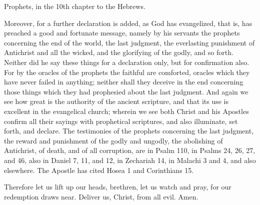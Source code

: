 Prophets, in the 10th chapter to the Hebrews.

Moreover, for a further declaration is added, as God has evangelized, that is, has preached a good and fortunate message, namely by his servants the prophets concerning the end of the world, the last judgment, the everlasting punishment of Antichrist and all the wicked, and the glorifying of the godly, and so forth. Neither did he say these things for a declaration only, but for confirmation also. For by the oracles of the prophets the faithful are comforted, oracles which they have never failed in anything; neither shall they deceive in the end concerning those things which they had prophesied about the last judgment. And again we see how great is the authority of the ancient scripture, and that its use is excellent in the evangelical church; wherein we see both Christ and his Apostles confirm all their sayings with prophetical scriptures, and also illuminate, set forth, and declare. The testimonies of the prophets concerning the last judgment, the reward and punishment of the godly and ungodly, the abolishing of Antichrist, of death, and of all corruption, are in Psalm 110, in Psalms 24, 26, 27, and 46, also in Daniel 7, 11, and 12, in Zechariah 14, in Malachi 3 and 4, and also elsewhere. The Apostle has cited Hosea 1 and Corinthians 15.

Therefore let us lift up our heads, brethren, let us watch and pray, for our redemption draws near. Deliver us, Christ, from all evil. Amen.
